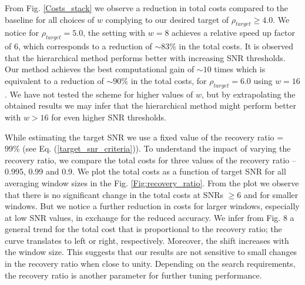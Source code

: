 From Fig. \ref{Costs_stack} we observe a reduction in total costs compared to the baseline for all choices of $w$ complying to our desired target of $\rho_{target} \geq 4.0$. We notice for $\rho_{target} = 5.0$, the setting with $w=8$ achieves a relative speed up factor of 6, which corresponds to a reduction of $\sim 83\%$ in the total costs. It is observed that the hierarchical method performs better with increasing SNR thresholds. Our method achieves the best computational gain of $\sim 10$ times which is equivalent to a reduction of $\sim 90\%$ in the total costs, for $\rho_{target} = 6.0$ using $w = 16$. We have not tested the scheme for higher values of $w$, but by extrapolating the obtained results we may infer that the hierarchical method might perform better with $w > 16$ for even higher SNR thresholds. 


While estimating the target SNR we use a fixed value of the recovery ratio = $99\%$ (see Eq. (\ref{target_snr_criteria})). To understand the impact of varying the recovery ratio, we compare the total costs for three values of the recovery ratio -- 0.995, 0.99 and 0.9. We plot the total costs as a function of target SNR for all averaging window sizes in the Fig. \ref{Fig:recovery_ratio}. From the plot we observe that there is no significant change in the total costs at SNRs $\geq 6$ and for smaller windows. But we notice a further reduction in costs for larger windows, especially at low SNR values, in exchange for the reduced accuracy. We infer from Fig. 8 a general trend for the total cost that is proportional to the recovery ratio; the curve translates to left or right, respectively. Moreover, the shift increases with the window size. This suggests that our results are not sensitive to small changes in the recovery ratio when close to unity. Depending on the search requirements, the recovery ratio is another parameter for further tuning performance.

